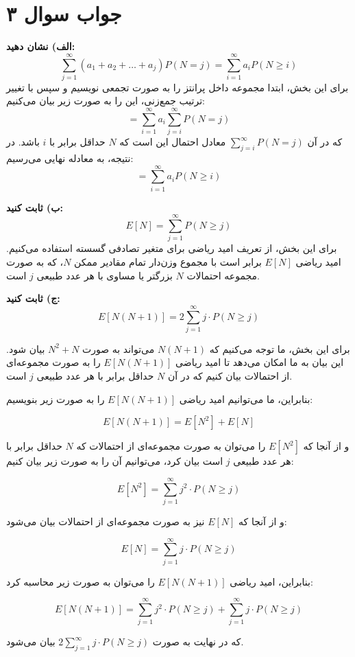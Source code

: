 \section*{جواب سوال ۳}

\textbf{الف) نشان دهید:} 
\[ \sum_{j=1}^{\infty} (a_1 + a_2 + \ldots + a_j) P(N = j) = \sum_{i=1}^{\infty} a_i P(N \geq i) \]
برای این بخش، ابتدا مجموعه داخل پرانتز را به صورت تجمعی نویسیم و سپس با تغییر ترتیب جمع‌زنی، این را به صورت زیر بیان می‌کنیم:
\[ = \sum_{i=1}^{\infty} a_i \sum_{j=i}^{\infty} P(N = j) \]
که در آن \(\sum_{j=i}^{\infty} P(N = j)\) معادل احتمال این است که \(N\) حداقل برابر با \(i\) باشد. در نتیجه، به معادله نهایی می‌رسیم:
\[ = \sum_{i=1}^{\infty} a_i P(N \geq i) \]

\textbf{ب) ثابت کنید:} 
\[ E[N] = \sum_{j=1}^{\infty} P(N \geq j) \]
برای این بخش، از تعریف امید ریاضی برای متغیر تصادفی گسسته استفاده می‌کنیم. امید ریاضی \(E[N]\) برابر است با مجموع وزن‌دار تمام مقادیر ممکن \(N\)، که به صورت مجموعه احتمالات \(N\) بزرگتر یا مساوی با هر عدد طبیعی \(j\) است.

\textbf{ج) ثابت کنید:} 
\[ E[N(N + 1)] = 2 \sum_{j=1}^{\infty} j \cdot P(N \geq j) \]

برای این بخش، ما توجه می‌کنیم که \(N(N + 1)\) می‌تواند به صورت \(N^2 + N\) بیان شود. این بیان به ما امکان می‌دهد تا امید ریاضی \(E[N(N + 1)]\) را به صورت مجموعه‌ای از احتمالات بیان کنیم که در آن \(N\) حداقل برابر با هر عدد طبیعی \(j\) است. 

بنابراین، ما می‌توانیم امید ریاضی \(E[N(N + 1)]\) را به صورت زیر بنویسیم:

\[
E[N(N + 1)] = E[N^2] + E[N]
\]

و از آنجا که \(E[N^2]\) را می‌توان به صورت مجموعه‌ای از احتمالات که \(N\) حداقل برابر با هر عدد طبیعی \(j\) است بیان کرد، می‌توانیم آن را به صورت زیر بیان کنیم:

\[
E[N^2] = \sum_{j=1}^{\infty} j^2 \cdot P(N \geq j)
\]

و از آنجا که \(E[N]\) نیز به صورت مجموعه‌ای از احتمالات بیان می‌شود:

\[
E[N] = \sum_{j=1}^{\infty} j \cdot P(N \geq j)
\]

بنابراین، امید ریاضی \(E[N(N + 1)]\) را می‌توان به صورت زیر محاسبه کرد:

\[
E[N(N + 1)] = \sum_{j=1}^{\infty} j^2 \cdot P(N \geq j) + \sum_{j=1}^{\infty} j \cdot P(N \geq j)
\]

که در نهایت به صورت \(2 \sum_{j=1}^{\infty} j \cdot P(N \geq j)\) بیان می‌شود.
